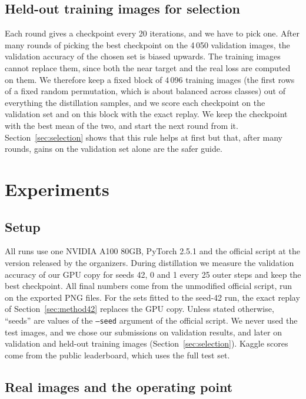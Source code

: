 \documentclass[journal]{IEEEtran}
\begin{document}
\subsection{Held-out training images for selection}
\label{sec:holdout}
Each round gives a checkpoint every 20 iterations, and we have to pick one. After many rounds of picking the best
checkpoint on the 4\,050 validation images, the validation accuracy of the chosen set is biased upwards. The
training images cannot replace them, since both the near target and the real loss are computed on them. We
therefore keep a fixed block of 4\,096 training images (the first rows of a fixed random permutation, which is about
balanced across classes) out of everything the distillation samples, and we score each checkpoint on the validation
set and on this block with the exact replay. We keep the checkpoint with the best mean of the two, and start the
next round from it. Section~\ref{sec:selection} shows that this rule helps at first but that, after many rounds,
gains on the validation set alone are the safer guide.

\section{Experiments}

\subsection{Setup}
All runs use one NVIDIA A100 80GB, PyTorch 2.5.1 and the official script at the version released by the organizers.
During distillation we measure the validation accuracy of our GPU copy for seeds 42, 0 and 1 every 25 outer steps
and keep the best checkpoint. All final numbers come from the unmodified official script, run on the exported PNG
files. For the sets fitted to the seed-42 run, the exact replay of Section~\ref{sec:method42} replaces the GPU copy.
Unless stated otherwise, ``seeds'' are values of the \texttt{--seed} argument of the official script. We never used
the test images, and we chose our submissions on validation results, and later on validation and held-out training
images (Section~\ref{sec:selection}). Kaggle scores come from the public leaderboard, which uses the full test set.

\subsection{Real images and the operating point}
\end{document}
